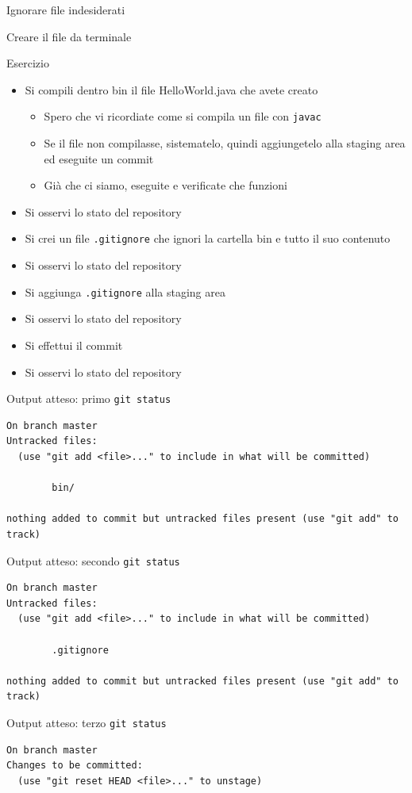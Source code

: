 \documentclass[presentation]{beamer}
\begin{document}
\begin{frame}{Ignorare file indesiderati}
\begin{block}{Creare il file da terminale}
	\end{block}
	\begin{block}{Esercizio}	
		\begin{itemize}
			\item Si compili dentro bin il file HelloWorld.java che avete creato
			\begin{itemize}
				\item Spero che vi ricordiate come si compila un file con \texttt{javac}
				\item Se il file non compilasse, sistematelo, quindi aggiungetelo alla staging area 
ed eseguite un commit
				\item Già che ci siamo, eseguite e verificate che funzioni
			\end{itemize}
			\item Si osservi lo stato del repository
			\item Si crei un file \texttt{.gitignore} che ignori la cartella bin e tutto il suo 
contenuto
			\item Si osservi lo stato del repository
			\item Si aggiunga \texttt{.gitignore} alla staging area
			\item Si osservi lo stato del repository
			\item Si effettui il commit
			\item Si osservi lo stato del repository
		\end{itemize}
	\end{block}
	\begin{block}{Output atteso: primo \texttt{git status}}
		\begin{Verbatim}[fontsize=\scriptsize]
On branch master
Untracked files:
  (use "git add <file>..." to include in what will be committed)

        bin/

nothing added to commit but untracked files present (use "git add" to track)
		\end{Verbatim}
	\end{block}
	\begin{block}{Output atteso: secondo \texttt{git status}}
		\begin{Verbatim}[fontsize=\scriptsize]
On branch master
Untracked files:
  (use "git add <file>..." to include in what will be committed)

        .gitignore

nothing added to commit but untracked files present (use "git add" to track)
		\end{Verbatim}
	\end{block}
	\begin{block}{Output atteso: terzo \texttt{git status}}
		\begin{Verbatim}[fontsize=\scriptsize]
On branch master
Changes to be committed:
  (use "git reset HEAD <file>..." to unstage)


\end{Verbatim}
\end{block}
\end{frame}
\end{document}
